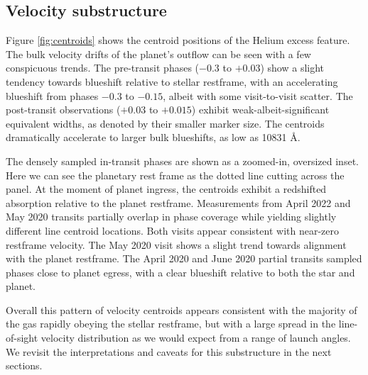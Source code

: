 \documentclass[twocolumn]{aastex631}
\begin{document}
\subsection{Velocity substructure}
Figure \ref{fig:centroids} shows the centroid positions of the Helium excess feature.  The bulk velocity drifts of the planet's outflow can be seen with a few conspicuous trends.  The pre-transit phases ($-0.3$ to $+0.03$) show a slight tendency towards blueshift relative to stellar restframe, with an accelerating blueshift from phases $-0.3$ to $-0.15$, albeit with some visit-to-visit scatter.  The post-transit observations ($+0.03$ to $+0.015$) exhibit weak-albeit-significant equivalent widths, as denoted by their smaller marker size.  The centroids dramatically accelerate to larger bulk blueshifts, as low as 10831 \AA.

The densely sampled in-transit phases are shown as a zoomed-in, oversized inset.  Here we can see the planetary rest frame as the dotted line cutting across the panel.  At the moment of planet ingress, the centroids exhibit a redshifted absorption relative to the planet restframe. Measurements from April 2022 and May 2020 transits partially overlap in phase coverage while yielding slightly different line centroid locations.  Both visits appear consistent with near-zero restframe velocity.  The May 2020 visit shows a slight trend towards alignment with the planet restframe.  The April 2020 and June 2020 partial transits sampled phases close to planet egress, with a clear blueshift relative to both the star and planet.

Overall this pattern of velocity centroids appears consistent with the majority of the gas rapidly obeying the stellar restframe, but with a large spread in the line-of-sight velocity distribution as we would expect from a range of launch angles.  We revisit the interpretations and caveats for this substructure in the next sections.
\end{document}
